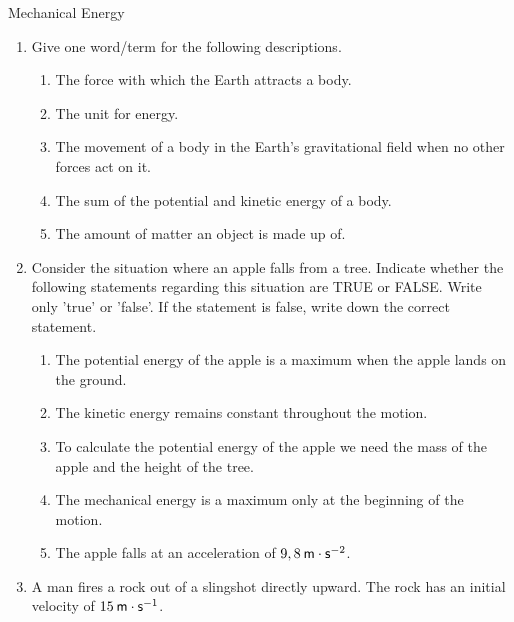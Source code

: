 \begin{eocexercises}{Mechanical Energy}
            \nopagebreak
      \label{m38786*id71520}\begin{enumerate}[noitemsep, label=\textbf{\arabic*}. ] 
            \label{m38786*uid118}\item Give one word/term for the following descriptions.
\label{m38786*id71536}\begin{enumerate}[noitemsep, label=\textbf{\alph*}. ] 
            \label{m38786*uid119}\item The force with which the Earth attracts a body.
\label{m38786*uid120}\item The unit for energy.
\label{m38786*uid121}\item The movement of a body in the Earth's gravitational field when no other forces act on it.
\label{m38786*uid122}\item The sum of the potential and kinetic energy of a body.
\label{m38786*uid123}\item The amount of matter an object is made up of.
\end{enumerate}
                \label{m38786*uid124}\item Consider the situation where an apple falls from a tree. Indicate whether the following statements regarding this situation are TRUE or FALSE. Write only 'true' or 'false'. If the statement is false, write down the correct statement.
\label{m38786*id71616}\begin{enumerate}[noitemsep, label=\textbf{\alph*}. ] 
            \label{m38786*uid125}\item The potential energy of the apple is a maximum when the apple lands on the ground.
\label{m38786*uid126}\item The kinetic energy remains constant throughout the motion.
\label{m38786*uid127}\item To calculate the potential energy of the apple we need the mass of the apple and the height of the tree.
\label{m38786*uid128}\item The mechanical energy is a maximum only at the beginning of the motion.
\label{m38786*uid129}\item The apple falls at an acceleration of $9,8\phantom{\rule{2pt}{0ex}}\mathsf{m}\ensuremath{\cdot}\mathsf{s}{}^{-2}$.
\end{enumerate}
                \label{m38786*uid131}\item A man fires a rock out of a slingshot directly upward. The rock has an initial velocity of $15\phantom{\rule{2pt}{0ex}}\mathsf{m}\ensuremath{\cdot}\mathsf{s}{}^{-1}$.

\end{enumerate}
\end{eocexercises}
